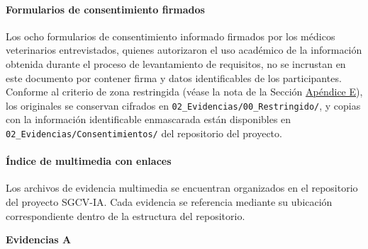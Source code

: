 \documentclass[
]{article}
\begin{document}
\paragraph{Formularios de consentimiento
firmados}\label{formularios-de-consentimiento-firmados}

Los ocho formularios de consentimiento informado firmados por los
médicos veterinarios entrevistados, quienes autorizaron el uso académico
de la información obtenida durante el proceso de levantamiento de
requisitos, no se incrustan en este documento por contener firma y datos
identificables de los participantes. Conforme al criterio de zona
restringida (véase la nota de la Sección \hyperref[apendice-e-repositorio]{Apéndice E}),
los originales se conservan cifrados en
\texttt{02\_Evidencias/00\_Restringido/}, y copias con la información
identificable enmascarada están disponibles en
\texttt{02\_Evidencias/Consentimientos/} del repositorio del proyecto.


\paragraph{Índice de multimedia con
enlaces}\label{indice-de-multimedia-con-enlaces}

Los archivos de evidencia multimedia se encuentran organizados en el
repositorio del proyecto SGCV-IA. Cada evidencia se referencia mediante
su ubicación correspondiente dentro de la estructura del repositorio.

\textbf{Evidencias A}
\end{document}
